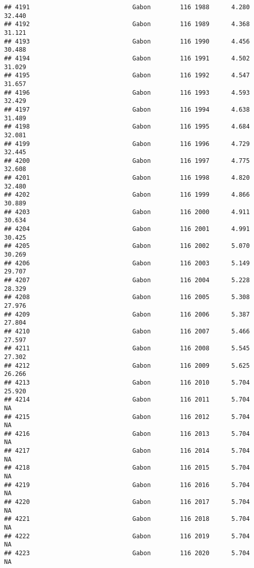 \documentclass[
]{article}
\begin{document}
\begin{verbatim}
## 4191                            Gabon        116 1988      4.280     32.440
## 4192                            Gabon        116 1989      4.368     31.121
## 4193                            Gabon        116 1990      4.456     30.488
## 4194                            Gabon        116 1991      4.502     31.029
## 4195                            Gabon        116 1992      4.547     31.657
## 4196                            Gabon        116 1993      4.593     32.429
## 4197                            Gabon        116 1994      4.638     31.489
## 4198                            Gabon        116 1995      4.684     32.081
## 4199                            Gabon        116 1996      4.729     32.445
## 4200                            Gabon        116 1997      4.775     32.608
## 4201                            Gabon        116 1998      4.820     32.480
## 4202                            Gabon        116 1999      4.866     30.889
## 4203                            Gabon        116 2000      4.911     30.634
## 4204                            Gabon        116 2001      4.991     30.425
## 4205                            Gabon        116 2002      5.070     30.269
## 4206                            Gabon        116 2003      5.149     29.707
## 4207                            Gabon        116 2004      5.228     28.329
## 4208                            Gabon        116 2005      5.308     27.976
## 4209                            Gabon        116 2006      5.387     27.804
## 4210                            Gabon        116 2007      5.466     27.597
## 4211                            Gabon        116 2008      5.545     27.302
## 4212                            Gabon        116 2009      5.625     26.266
## 4213                            Gabon        116 2010      5.704     25.920
## 4214                            Gabon        116 2011      5.704         NA
## 4215                            Gabon        116 2012      5.704         NA
## 4216                            Gabon        116 2013      5.704         NA
## 4217                            Gabon        116 2014      5.704         NA
## 4218                            Gabon        116 2015      5.704         NA
## 4219                            Gabon        116 2016      5.704         NA
## 4220                            Gabon        116 2017      5.704         NA
## 4221                            Gabon        116 2018      5.704         NA
## 4222                            Gabon        116 2019      5.704         NA
## 4223                            Gabon        116 2020      5.704         NA

\end{verbatim}
\end{document}
